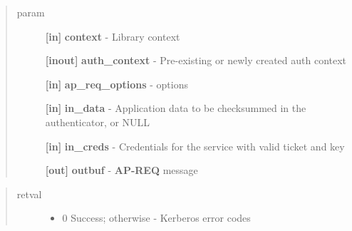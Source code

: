 \documentclass[letterpaper,10pt,english]{sphinxmanual}
\begin{document}
\begin{fulllineitems}
\label{appdev/refs/api/krb5_mk_req_extended:krb5_mk_req_extended}
\end{fulllineitems}

\begin{quote}\begin{description}
\item[{param}] \leavevmode
\textbf{{[}in{]}} \textbf{context} - Library context

\textbf{{[}inout{]}} \textbf{auth\_context} - Pre-existing or newly created auth context

\textbf{{[}in{]}} \textbf{ap\_req\_options} -  options

\textbf{{[}in{]}} \textbf{in\_data} - Application data to be checksummed in the authenticator, or NULL

\textbf{{[}in{]}} \textbf{in\_creds} - Credentials for the service with valid ticket and key

\textbf{{[}out{]}} \textbf{outbuf} - \textbf{AP-REQ} message

\end{description}\end{quote}
\begin{quote}\begin{description}
\item[{retval}] \leavevmode\begin{itemize}
\item {} 
0   Success; otherwise - Kerberos error codes

\end{itemize}

\end{description}\end{quote}
\end{document}
